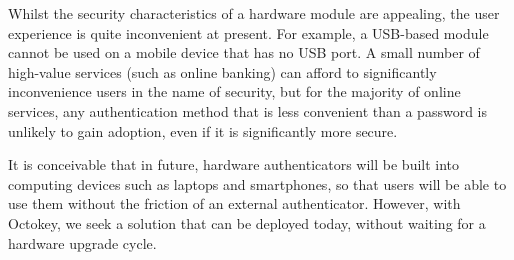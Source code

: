Whilst the security characteristics of a hardware module are appealing, the user experience is quite
inconvenient at present. For example, a USB-based module cannot be used on a mobile device that has
no USB port. A small number of high-value services (such as online banking) can afford to
significantly inconvenience users in the name of security, but for the majority of online services,
any authentication method that is less convenient than a password is unlikely to gain adoption, even
if it is significantly more secure.

It is conceivable that in future, hardware authenticators will be built into computing devices such
as laptops and smartphones, so that users will be able to use them without the friction of an
external authenticator. However, with Octokey, we seek a solution that can be deployed today, without
waiting for a hardware upgrade cycle.
